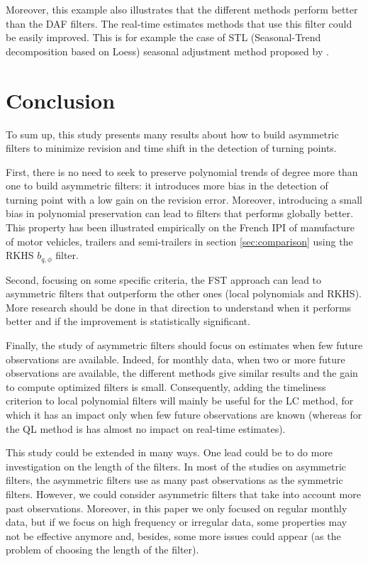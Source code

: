 \documentclass[
  12pt,
  ,
  a4paper]{article}
\newcommand\1{\mathds{1}}
\begin{document}
Moreover, this example also illustrates that the different methods perform better than the DAF filters.
The real-time estimates methods that use this filter could be easily improved.
This is for example the case of STL (Seasonal-Trend decomposition based on Loess) seasonal adjustment method proposed by \textcite{cleveland90}.

\newpage

\hypertarget{conclusion}{%
\section*{Conclusion}\label{conclusion}}

To sum up, this study presents many results about how to build asymmetric filters to minimize revision and time shift in the detection of turning points.

First, there is no need to seek to preserve polynomial trends of degree more than one to build asymmetric filters: it introduces more bias in the detection of turning point with a low gain on the revision error. Moreover, introducing a small bias in polynomial preservation can lead to filters that performs globally better.
This property has been illustrated empirically on the French IPI of manufacture of motor vehicles, trailers and semi-trailers in section \ref{sec:comparison} using the RKHS \(b_{q,\phi}\) filter.

Second, focusing on some specific criteria, the FST approach can lead to asymmetric filters that outperform the other ones (local polynomials and RKHS).
More research should be done in that direction to understand when it performs better and if the improvement is statistically significant.

Finally, the study of asymmetric filters should focus on estimates when few future observations are available.
Indeed, for monthly data, when two or more future observations are available, the different methods give similar results and the gain to compute optimized filters is small.
Consequently, adding the timeliness criterion to local polynomial filters will mainly be useful for the LC method, for which it has an impact only when few future observations are known (whereas for the QL method is has almost no impact on real-time estimates).

This study could be extended in many ways.
One lead could be to do more investigation on the length of the filters.
In most of the studies on asymmetric filters, the asymmetric filters use as many past observations as the symmetric filters.
However, we could consider asymmetric filters that take into account more past observations.
Moreover, in this paper we only focused on regular monthly data, but if we focus on high frequency or irregular data, some properties may not be effective anymore and, besides, some more issues could appear (as the problem of choosing the length of the filter).
\end{document}

